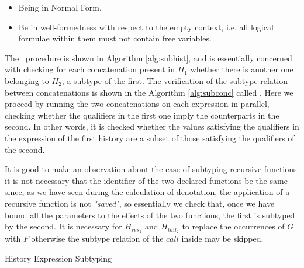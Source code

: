 \begin{itemize}
    \item Being in Normal Form.
    \item Be in well-formedness with respect to the empty context, i.e. all logical formulae within them must not contain free variables.
\end{itemize}

The \subhist\ procedure is shown in Algorithm \ref{alg:subhist}, and is essentially concerned with checking for each concatenation present in $H_1$ whether there is another one belonging to $H_2$, a subtype of the first. The verification of the subtype relation between concatenations is shown in the Algorithm \ref{alg:subconc} called \subconc. Here we proceed by running the two concatenations on each expression in parallel, checking whether the qualifiers in the first one imply the counterparts in the second. In other words, it is checked whether the values satisfying the qualifiers in the expression of the first history are a subset of those satisfying the qualifiers of the second.

It is good to make an observation about the case of subtyping recursive functions: it is not necessary that the identifier of the two declared functions be the same since, as we have seen during the calculation of denotation, the application of a recursive function is not \emph{"saved"}, so essentially we check that, once we have bound all the parameters to the effects of the two functions, the first is subtyped by the second. It is necessary for $H_{res_2}$ and $H_{tail_2}$ to replace the occurrences of $G$ with $F$ otherwise the subtype relation of the $call$ inside may be skipped.

\begin{algorithm}[ht]
    \caption{History Expression Subtyping}\label{alg:subhist}
    \begin{algorithmic}[1]
                            \State \Return \True
                        \EndIf                       
                    \EndFor
                    \State \Return \False
                \EndCase
                            \State \Return {}
                        \EndIf                       
                    \EndFor
                    \State \Return \False
                \EndCase
            \EndMatch
        \EndProcedure
    \end{algorithmic}
\end{algorithm}

